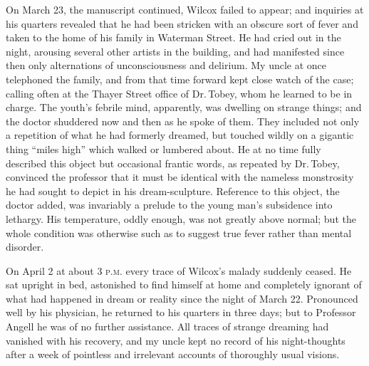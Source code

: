 On March 23, the manuscript continued, Wilcox failed to appear; and
inquiries at his quarters revealed that he had been stricken with an
obscure sort of fever and taken to the home of his family in Waterman
Street. He had cried out in the night, arousing several other artists in
the building, and had manifested since then only alternations of
unconsciousness and delirium. My uncle at once telephoned the family,
and from that time forward kept close watch of the case; calling often
at the Thayer Street office of Dr.\,Tobey, whom he learned to be in
charge. The youth's febrile mind, apparently, was dwelling on strange
things; and the doctor shuddered now and then as he spoke of them. They
included not only a repetition of what he had formerly dreamed, but
touched wildly on a gigantic thing ``miles high'' which walked or
lumbered about.
He at no time fully described this object but occasional frantic words,
as repeated by Dr.\,Tobey, convinced the professor that it must be
identical with the nameless monstrosity he had sought to depict in his
dream-sculpture. Reference to this object, the doctor added, was
invariably a prelude to the young man's subsidence into lethargy. His
temperature, oddly enough, was not greatly above normal; but the whole
condition was otherwise such as to suggest true fever rather than mental
disorder.

On April 2 at about 3 \textsc{p.m.} every trace of Wilcox's malady suddenly
ceased. He sat upright in bed, astonished to find himself at home and
completely ignorant of what had happened in dream or reality since the
night of March 22. Pronounced well by his physician, he returned to his
quarters in three days; but to Professor Angell he was of no further
assistance. All traces of strange dreaming had vanished with his
recovery, and my uncle kept no record of his night-thoughts after a week
of pointless and irrelevant accounts of thoroughly usual visions.

